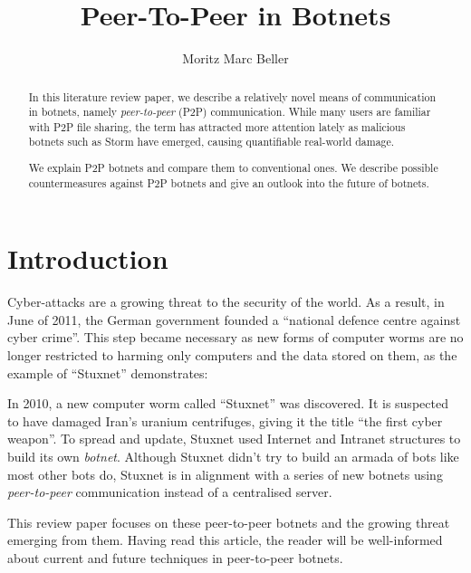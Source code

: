 \documentclass{llncs}
\title{Peer-To-Peer in Botnets}
\author{Moritz Marc Beller}
\institute{%
   Fakultät für Informatik, \\
   Technische Universität München \\
   \email{\{beller\}@in.tum.de}
}
\begin{document}
\maketitle

\begin{abstract}
In this literature review paper, we describe a relatively novel means
of communication in botnets, namely {\it peer-to-peer} (P2P)
communication.  While many users are familiar with P2P file sharing,
the term has attracted more attention lately as malicious botnets such
as Storm\cite{davis2008sybil} have emerged, causing quantifiable
real-world damage.

We explain P2P botnets and compare them to conventional ones. We
describe possible countermeasures against P2P botnets and give an
outlook into the future of botnets.
\end{abstract}

\section{Introduction}

Cyber-attacks are a growing threat to the security of the world. As a
result, in June of 2011, the German government founded a ``national
defence centre against cyber crime''.\cite{cyber} This step became
necessary as new forms of computer worms are no longer restricted to
harming only computers and the data stored on them, as the example of
``Stuxnet'' demonstrates:

 In 2010, a new computer worm called ``Stuxnet'' was discovered. It is
 suspected to have damaged Iran's uranium centrifuges, giving it the
 title ``the first cyber weapon''\cite{benzin2011first}. To spread and
 update, Stuxnet used Internet and Intranet structures to build its
 own {\it botnet}.\cite{fallierew32} Although Stuxnet didn't try to
 build an armada of bots like most other bots do, Stuxnet is in
 alignment with a series of new botnets using {\it peer-to-peer}
 communication instead of a centralised server.

This review paper focuses on these peer-to-peer botnets and the
growing threat emerging from them. Having read this article, the
reader will be well-informed about current and future techniques in
peer-to-peer botnets.
\end{document}

